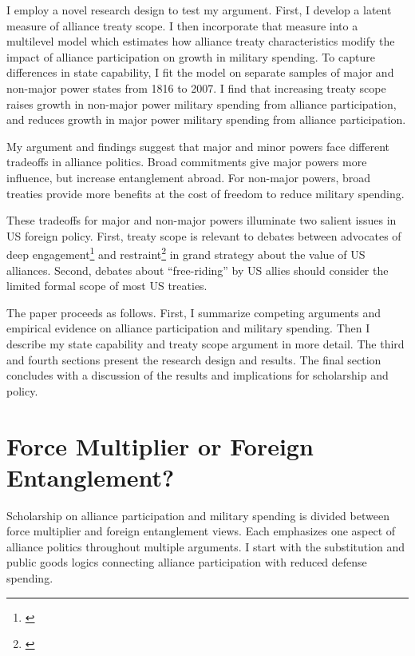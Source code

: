 \documentclass[12pt]{article}
\begin{document}
I employ a novel research design to test my argument.
First, I develop a latent measure of alliance treaty scope. 
I then incorporate that measure into a multilevel model which estimates how alliance treaty characteristics modify the impact of alliance participation on growth in military spending.
To capture differences in state capability, I fit the model on separate samples of major and non-major power states from 1816 to 2007. 
I find that increasing treaty scope raises growth in non-major power military spending from alliance participation, and reduces growth in major power military spending from alliance participation. 


My argument and findings suggest that major and minor powers face different tradeoffs in alliance politics.
Broad commitments give major powers more influence, but increase entanglement abroad.
For non-major powers, broad treaties provide more benefits at the cost of freedom to reduce military spending. 


These tradeoffs for major and non-major powers illuminate two salient issues in US foreign policy. 
First, treaty scope is relevant to debates between advocates of deep engagement\footnote{\citep{Brooksetal2013}} and restraint\footnote{\citep{Posen2014}} in grand strategy about the value of US alliances. 
Second, debates about ``free-riding'' by US allies should consider the limited formal scope of most US treaties. 


The paper proceeds as follows. 
First, I summarize competing arguments and empirical evidence on alliance participation and military spending. 
Then I describe my state capability and treaty scope argument in more detail. 
The third and fourth sections present the research design and results. 
The final section concludes with a discussion of the results and implications for scholarship and policy.  



\section{Force Multiplier or Foreign Entanglement?}


Scholarship on alliance participation and military spending is divided between force multiplier and foreign entanglement views.
Each emphasizes one aspect of alliance politics throughout multiple arguments.  
I start with the substitution and public goods logics connecting alliance participation with reduced defense spending. 
\end{document}
